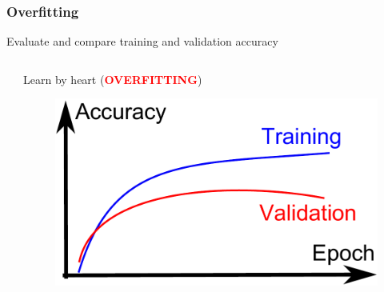 \begin{frame}

\frametitle{Overfitting}

\begin{block}{ Evaluate and compare training and validation accuracy}
\begin{columns}
\begin{column}{.45\textwidth}
\end{column}
\begin{column}{.45\textwidth}
Learn by heart (\textbf{\textcolor{red}{OVERFITTING}})
\begin{figure}
\includegraphics[width=.9\textwidth]{Figures/overfitting.pdf} 
\end{figure}

\end{column}
\end{columns}

\end{block}


\end{frame}

